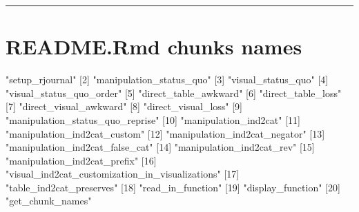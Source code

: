 \begin{center}\rule{0.5\linewidth}{0.5pt}\end{center}

\hypertarget{readme.rmd-chunks-names}{%
\section{README.Rmd chunks names}\label{readme.rmd-chunks-names}}

\begin{Schunk}
\begin{Soutput}
      [1] "setup_rjournal"                                
      [2] "manipulation_status_quo"                       
      [3] "visual_status_quo"                             
      [4] "visual_status_quo_order"                       
      [5] "direct_table_awkward"                          
      [6] "direct_table_loss"                             
      [7] "direct_visual_awkward"                         
      [8] "direct_visual_loss"                            
      [9] "manipulation_status_quo_reprise"               
     [10] "manipulation_ind2cat"                          
     [11] "manipulation_ind2cat_custom"                   
     [12] "manipulation_ind2cat_negator"                  
     [13] "manipulation_ind2cat_false_cat"                
     [14] "manipulation_ind2cat_rev"                      
     [15] "manipulation_ind2cat_prefix"                   
     [16] "visual_ind2cat_customization_in_visualizations"
     [17] "table_ind2cat_preserves"                       
     [18] "read_in_function"                              
     [19] "display_function"                              
     [20] "get_chunk_names"
\end{Soutput}
\end{Schunk}



\address{%
Evangeline Reynolds\\
Affiliation\\%
line 1\\ line 2\\
%
\url{https://journal.r-project.org}\\%
\textit{ORCiD: \href{https://orcid.org/0000-0002-9079-593X}{0000-0002-9079-593X}}\\%
\href{mailto:author1@work}{\nolinkurl{author1@work}}%
}

